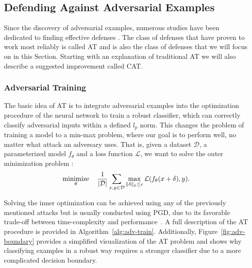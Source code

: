 \subsection{Defending Against Adversarial Examples}
Since the discovery of adversarial examples, numerous studies have been dedicated to finding effective defenses \parencite{papernot2016distillation, tramer2017ensemble, lin2019defensive}. The class of defenses that have proven to work most reliably \parencite{athalye2018obfuscated} is called \ac{AT} and is also the class of defenses that we will focus on in this Section. Starting with an explanation of traditional \ac{AT} we will also describe a suggested improvement called \ac{CAT}.

\subsubsection{Adversarial Training}
The basic idea of \ac{AT} is to integrate adversarial examples into the optimization procedure of the neural network to train a robust classifier, which can correctly classify adversarial inputs within a defined $l_p$ norm. This changes the problem of training a model to a min-max problem, where our goal is to perform  well, no matter what attack an adversary uses. That is, given a dataset $\mathcal{D}$, a parameterized model $f_\theta$ and a loss function $\mathcal{L}$, we want to solve the outer minimization problem \parencite{madry2017towards}:
\begin{equation}
\operatorname*{minimize}_\theta \quad \frac{1}{|\mathcal{D}|}\sum_{x,y\in\mathcal{D}}\max_{\|\delta\|_p\le\epsilon}\mathcal{L}(f_\theta(x+\delta), y).
\label{eq:adv-training}
\end{equation}

Solving the inner optimization can be achieved using any of the previously mentioned attacks but is usually conducted using \ac{PGD}, due to its favorable trade-off between time-complexity and performance~\parencite{madry2017towards}. A full description of the \ac{AT} procedure is provided in Algorithm~\ref{alg:adv-train}. Additionally, Figure~\ref{fig:adv-boundary} provides a simplified visualization of the \ac{AT} problem and shows why classifying examples in a robust way requires a stronger classifier due to a more complicated decision boundary.

